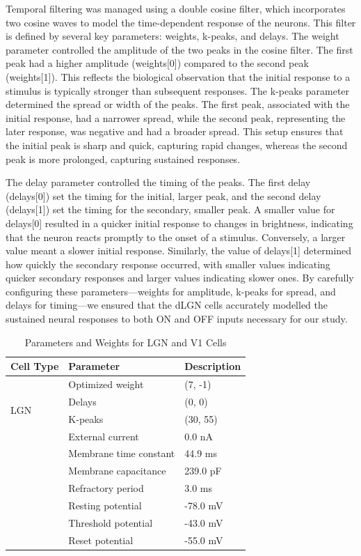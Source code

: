 \documentclass[12pt]{article}
\begin{document}
Temporal filtering was managed using a double cosine filter, which incorporates two cosine waves to model the time-dependent response of the neurons. This filter is defined by several key parameters: weights, k-peaks, and delays. The weight parameter controlled the amplitude of the two peaks in the cosine filter. The first peak had a higher amplitude (weights[0]) compared to the second peak (weights[1]). This reflects the biological observation that the initial response to a stimulus is typically stronger than subsequent responses. The k-peaks parameter determined the spread or width of the peaks. The first peak, associated with the initial response, had a narrower spread, while the second peak, representing the later response, was negative and had a broader spread. This setup ensures that the initial peak is sharp and quick, capturing rapid changes, whereas the second peak is more prolonged, capturing sustained responses.

The delay parameter controlled the timing of the peaks. The first delay (delays[0]) set the timing for the initial, larger peak, and the second delay (delays[1]) set the timing for the secondary, smaller peak. A smaller value for delays[0] resulted in a quicker initial response to changes in brightness, indicating that the neuron reacts promptly to the onset of a stimulus. Conversely, a larger value meant a slower initial response. Similarly, the value of delays[1] determined how quickly the secondary response occurred, with smaller values indicating quicker secondary responses and larger values indicating slower ones. By carefully configuring these parameters—weights for amplitude, k-peaks for spread, and delays for timing—we ensured that the dLGN cells accurately modelled the sustained neural responses to both ON and OFF inputs necessary for our study.

\begin{table}[H]
  \centering
  \caption{Parameters and Weights for LGN and V1 Cells}
  \begin{tabular}{lll}
  \toprule
  \textbf{Cell Type} & \textbf{Parameter} & \textbf{Description} \\
  \midrule
  \multirow{4}{*}{LGN} 
      & Optimized weight      & (7, -1) \\
      & Delays   & (0, 0) \\
      & K-peaks   & (30, 55) \\
  \midrule
  \multirow{7}{*}{V1} 
      & External current         & 0.0 nA \\
      & Membrane time constant        & 44.9 ms \\
      & Membrane capacitance          & 239.0 pF \\
      & Refractory period       & 3.0 ms \\
      & Resting potential          & -78.0 mV \\
      & Threshold potential         & -43.0 mV \\
      & Reset potential      & -55.0 mV \\
  \bottomrule
  \end{tabular}
\end{table}
\end{document}
